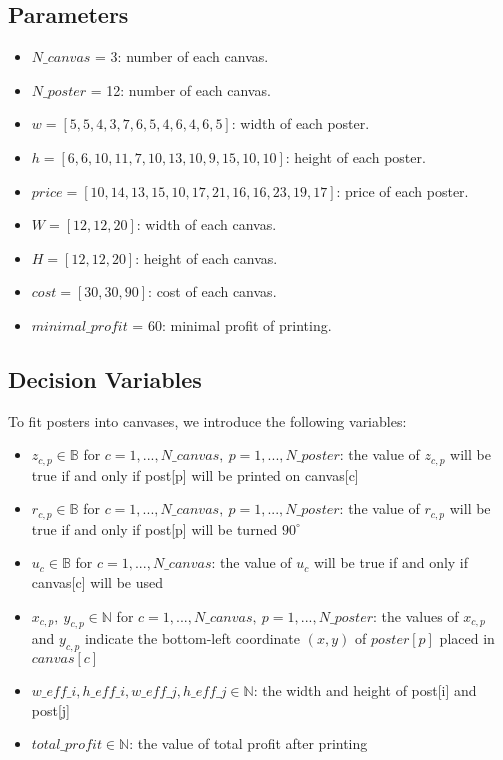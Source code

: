 \documentclass{article}
\begin{document}
\subsection{Parameters}
\begin{itemize}
  \item $N\_canvas$ = 3: number of each canvas.
  \item $N\_poster$ = 12: number of each canvas.
  \item $w = [5, 5, 4, 3, 7, 6, 5, 4, 6, 4, 6, 5]$: width of each poster.
  \item $h = [6, 6, 10, 11, 7, 10, 13, 10, 9, 15, 10, 10]$: height of each poster.
  \item $price = [10, 14, 13, 15, 10, 17, 21, 16, 16, 23, 19, 17]$: price of each poster.
  \item $W = [12, 12, 20]$: width of each canvas.
  \item $H = [12, 12, 20]$: height of each canvas.
  \item $cost = [30, 30, 90]$: cost of each canvas.
  \item $minimal\_profit$ = 60: minimal profit of printing.
\end{itemize}

\subsection{Decision Variables}
To fit posters into canvases, we introduce the following variables:
\begin{itemize}
  \item $z_{c,p} \in \mathbb{B}$ for $c = 1,...,N\_canvas,\ p = 1,...,N\_poster$: the value of $z_{c,p}$ will be true if and only if post[p] will be printed on canvas[c]
  \item $r_{c,p} \in \mathbb{B}$ for $c = 1,...,N\_canvas,\ p = 1,...,N\_poster$: the value of $r_{c,p}$ will be true if and only if post[p] will be turned $90^\circ$ 
  \item $u_c \in \mathbb{B}$ for $c = 1,...,N\_canvas$: the value of $u_c$ will be true if and only if canvas[c] will be used
  \item $x_{c,p},\ y_{c,p} \in \mathbb{N}$ for $c = 1,...,N\_canvas,\ p = 1,...,N\_poster$: the values of $x_{c,p}$ and $y_{c,p}$ indicate the bottom-left coordinate $(x,y)$ of $poster[p]$ placed in $canvas[c]$
  \item $w\_eff\_i,h\_eff\_i,w\_eff\_j,h\_eff\_j \in \mathbb{N}$: the width and height of post[i] and post[j]
  \item $total\_profit \in \mathbb{N}$: the value of total profit after printing
\end{itemize}
\end{document}
